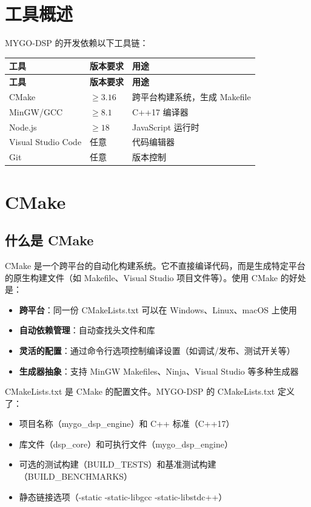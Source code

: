 ﻿\documentclass[12pt,a4paper,oneside]{ctexbook}
\begin{document}
\section{工具概述}

MYGO-DSP 的开发依赖以下工具链：

\begin{longtable}{p{3cm}p{3cm}p{8cm}}
    \toprule
    \textbf{工具} & \textbf{版本要求} & \textbf{用途} \\
    \midrule
    \endfirsthead
    \toprule
    \textbf{工具} & \textbf{版本要求} & \textbf{用途} \\
    \midrule
    \endhead
    \bottomrule
    \endfoot
    CMake & \(\geq 3.16\) & 跨平台构建系统，生成 Makefile \\
    MinGW/GCC & \(\geq 8.1\) & C++17 编译器 \\
    Node.js & \(\geq 18\) & JavaScript 运行时 \\
    Visual Studio Code & 任意 & 代码编辑器 \\
    Git & 任意 & 版本控制 \\
    \bottomrule
\end{longtable}

\section{CMake}

\subsection{什么是 CMake}

CMake 是一个跨平台的自动化构建系统。它不直接编译代码，而是生成特定平台的原生构建文件（如 Makefile、Visual Studio 项目文件等）。使用 CMake 的好处是：

\begin{itemize}
    \item \textbf{跨平台}：同一份 CMakeLists.txt 可以在 Windows、Linux、macOS 上使用
    \item \textbf{自动依赖管理}：自动查找头文件和库
    \item \textbf{灵活的配置}：通过命令行选项控制编译设置（如调试/发布、测试开关等）
    \item \textbf{生成器抽象}：支持 MinGW Makefiles、Ninja、Visual Studio 等多种生成器
\end{itemize}

CMakeLists.txt 是 CMake 的配置文件。MYGO-DSP 的 CMakeLists.txt 定义了：
\begin{itemize}
    \item 项目名称（mygo\_dsp\_engine）和 C++ 标准（C++17）
    \item 库文件（dsp\_core）和可执行文件（mygo\_dsp\_engine）
    \item 可选的测试构建（BUILD\_TESTS）和基准测试构建（BUILD\_BENCHMARKS）
    \item 静态链接选项（-static -static-libgcc -static-libstdc++）
\end{itemize}
\end{document}
